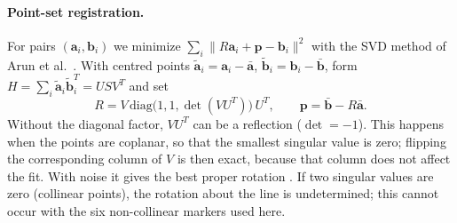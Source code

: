 \documentclass[10pt]{article}
\newcommand{\vect}[1]{\mathbf{#1}}
\begin{document}
\paragraph{Point-set registration.} For pairs $(\vect a_i,\vect b_i)$ we minimize $\sum_i\|R\vect a_i+\vect p-\vect b_i\|^2$ with the SVD method of Arun et al.\ \cite{arun,lecrigid}. With centred points $\tilde{\vect a}_i=\vect a_i-\bar{\vect a}$, $\tilde{\vect b}_i=\vect b_i-\bar{\vect b}$, form $H=\sum_i\tilde{\vect a}_i\tilde{\vect b}_i^T=USV^T$ and set
\begin{equation}
R = V\,\mathrm{diag}\big(1,1,\det(VU^T)\big)\,U^T,\qquad \vect p=\bar{\vect b}-R\bar{\vect a}.
\end{equation}
Without the diagonal factor, $VU^T$ can be a reflection ($\det=-1$). This happens when the points are coplanar, so that the smallest singular value is zero; flipping the corresponding column of $V$ is then exact, because that column does not affect the fit. With noise it gives the best proper rotation \cite{umeyama}. If two singular values are zero (collinear points), the rotation about the line is undetermined; this cannot occur with the six non-collinear markers used here.
\end{document}
